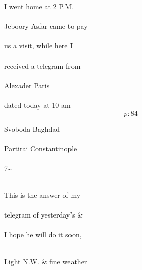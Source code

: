 \documentclass{report}
\begin{document}
	\par{
 	I went home at 2 P.M.\ \\\ \\Jeboory Asfar came to pay\ \\\ \\us a visit, while here I\ \\\ \\received a telegram from\ \\\ \\Alexader Paris\ \\\ \\dated today at 10 am\ \\
  \[p: 84 \]

	}


	\par{
 	Svoboda Baghdad\ \\\ \\Partirai Constantinople\ \\\ \\7\~{}\ \\\ \\
	}

	\par{
 	This is the answer of my\ \\\ \\telegram of yesterday’s \&\ \\\ \\I hope he will do it soon,\ \\\ \\
	}

	\par{
 	Light N.W. \& fine weather\ \\\ \\\ \\\ \\
	}
\end{document}
